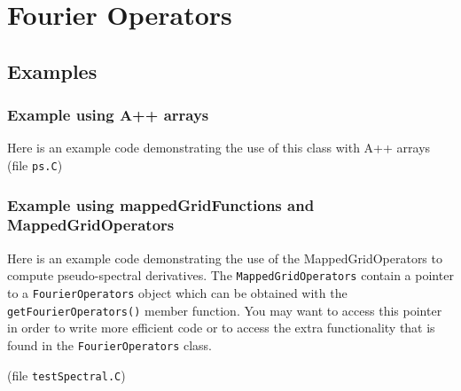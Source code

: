 \section{Fourier Operators}



\subsection{Examples}

\subsubsection{Example using A++ arrays}
Here is an example code demonstrating the use of this class with A++ arrays
(file {\tt \examples ps.C})
{\footnotesize
{}
}
\subsubsection{Example using mappedGridFunctions and MappedGridOperators}
Here is an example code demonstrating the use of the MappedGridOperators to compute
pseudo-spectral derivatives. The {\tt MappedGridOperators} contain a pointer to a
{\tt FourierOperators} object which can be obtained with the {\tt getFourierOperators()}
member function. You may want to access this pointer in order to write more efficient code
or to access the extra functionality that is found in the {\tt FourierOperators} class.


(file {\tt \examples testSpectral.C})
{\footnotesize
{}
}

